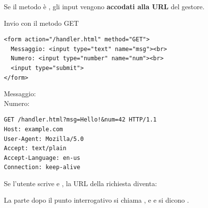 Se il metodo è , gli input vengono \textbf{accodati alla URL} del
gestore.

\begin{esempio}{Invio con il metodo GET}
\begin{affianco}[0.53]
\begin{lstlisting}[style=html, name=form-get.html]
<form action="/handler.html" method="GET">
  Messaggio: <input type="text" name="msg"><br>
  Numero: <input type="number" name="num"><br>
  <input type="submit">
</form>
\end{lstlisting}
\risultato
\begin{browser}
  Messaggio: \\[3pt]
  Numero: \\[5pt]
\end{browser}
\begin{lstlisting}[style=http, name=Richiesta generata]
GET /handler.html?msg=Hello!&num=42 HTTP/1.1
Host: example.com
User-Agent: Mozilla/5.0
Accept: text/plain
Accept-Language: en-us
Connection: keep-alive
\end{lstlisting}
\end{affianco}

Se l'utente scrive  e , la URL della richiesta diventa:

\begin{center}
\end{center}

La parte dopo il punto interrogativo si chiama , e
 e  si dicono .
\end{esempio}

